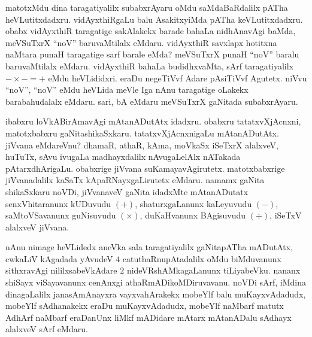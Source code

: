 matotxMdu dina taragatiyalilx subabxrAyaru oMdu saMdaBaRdalilx pATha heVLutitxdadxru. vidAyxthiRgaLu balu AsakitxyiMda pATha keVLutitxdadxru. obabx vidAyxthiR taragatige sakAlakekx barade bahaLa nidhAnavAgi baMda, meVSuTxrX ``noV'' baruvaMtilalx eMdaru. vidAyxthiR savxlapx hotitxna naMtara punaH taragatige sarf barale eMda? meVSuTxrX punaH ``noV'' baralu baruvaMtilalx eMdaru. vidAyxthiR bahaLa budidhxvaMta, sArf taragatiyalilx $-\times-=+$ eMdu heVLididxri. eraDu negeTiVvf Adare pAsiTiVvf Agutetx. niVvu ``noV'', ``noV'' eMdu heVLida meVle Iga nAnu taragatige oLakekx barabahudalalx eMdaru. sari, bA eMdaru meVSuTxrX gaNitada subabxrAyaru.

\medskip

ibabxru loVkABirAmavAgi mAtanADutAtx idadxru. obabxru tatatxvXjAcnxni, matotxbabxru gaNitashikaSxkaru. tatatxvXjAcnxnigaLu mAtanADutAtx. jiVvana eMdareVnu? dhamaR, athaR, kAma, moVkaSx iSeTxrX alalxveV, huTuTx, sAvu ivugaLa madhayxdalilx nAvugaLelAlx nATakada pAtarxdhArigaLu. obabxrige jiVvana suKamayavAgirutetx. matotxbabxrige jiVvanadalilx kaSaTx kApaRNayxgaLirutetx eMdaru. namamx gaNita shikaSxkaru noVDi, jiVvanaveV gaNita idadxMte mAtanADutatx senxVhitaranunx kUDuvudu $(+)$, shaturxgaLanunx kaLeyuvudu $(-)$, saMtoVSavanunx guNisuvudu $(\times)$, duKaHvanunx BAgisuvudu $(\div)$, iSeTxV alalxveV jiVvana.

\medskip

nAnu nimage heVLidedx aneVka sala taragatiyalilx gaNitapATha mADutAtx, cwkaLiV kAgadada yAvudeV $4$ catuthaRnupAtadalilx oMdu biMduvanunx sithxravAgi nililxsabeVkAdare $2$ nideVRshAMkagaLanunx tiLiyabeVku. nananx shiSayx viSayavanunx cenAnxgi athaRmADikoMDiruvavanu. noVDi sArf, iMdina dinagaLalilx janasAmAnayxra vayxvahArakekx mobeYlf balu muKayxvAdadudx, mobeYlf sAdhanakekx eraDu muKayxvAdadudx, mobeYlf naMbarf matutx AdhArf naMbarf eraDanUnx liMkf mADidare mAtarx mAtanADalu sAdhayx alalxveV sArf eMdaru.

\newpage


